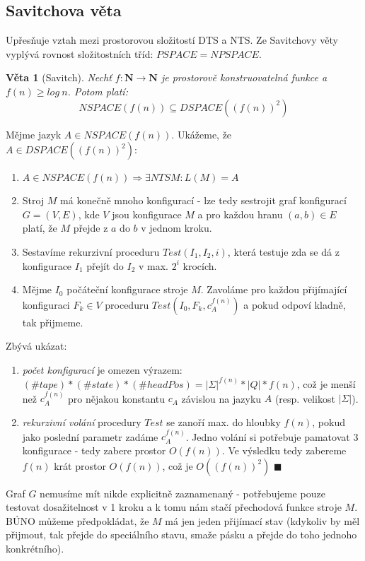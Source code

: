 \documentclass[a4paper]{article}      %
\newtheorem{theorem}{Věta}[section]
\newenvironment{proof}[1][Důkaz]{\begin{trivlist}
\item[\hskip \labelsep {\bfseries #1}]}{\end{trivlist}}
\newcommand{\qed}{$\blacksquare$}
\begin{document}
\subsection{Savitchova věta}
Upřesňuje vztah mezi prostorovou složitostí DTS a NTS. Ze Savitchovy věty vyplývá rovnost složitostních tříd: $PSPACE = NPSPACE$.

\begin{theorem}[Savitch]
Nechť $f: \mathbf{N} \rightarrow \mathbf{N}$ je prostorově konstruovatelná funkce a $f(n)\geq log\ n$.
Potom platí:
\[
NSPACE(f(n)) \subseteq DSPACE((f(n))^{2})
\]
\end{theorem}

\begin{proof}
Mějme jazyk $A\in NSPACE(f(n))$. Ukážeme, že $A \in DSPACE((f(n))^{2})$:
\begin{enumerate}
\item $A \in NSPACE(f(n)) \Rightarrow \exists NTS M: L(M)=A$
\item Stroj $M$ má konečně mnoho konfigurací - lze tedy sestrojit graf konfigurací $G=(V,E)$, kde $V$ jsou konfigurace $M$ a pro každou hranu $(a,b) \in E$ platí, že $M$ přejde z $a$ do $b$ v jednom kroku. 
\item Sestavíme rekurzivní proceduru $Test(I_1,I_2,i)$, která testuje zda se dá z konfigurace $I_1$ přejít do $I_2$ v max. $2^{i}$ krocích.
\item Mějme $I_0$ počáteční konfigurace stroje $M$. Zavoláme pro každou přijímající konfiguraci $F_k \in V$ proceduru $Test(I_0,F_k,c_{A}^{f(n)})$ a pokud odpoví kladně, tak přijmeme. 
\end{enumerate}
Zbývá ukázat:
\begin{enumerate}
\item \emph{počet konfigurací} je omezen výrazem: $(\#tape)*(\#state)*(\#headPos) = |\Sigma|^{f(n)}*|Q|*f(n)$,
což je menší než $c_{A}^{f(n)}$ pro nějakou konstantu $c_{A}$ závislou na jazyku $A$ (resp. velikost $|\Sigma|$).
\item \emph{rekurzivní volání} procedury $Test$ se zanoří max. do hloubky $f(n)$, pokud jako poslední parametr zadáme $c_{A}^{f(n)}$. Jedno volání si potřebuje pamatovat 3 konfigurace - tedy zabere prostor $O(f(n))$. Ve výsledku tedy zabereme $f(n)$ krát prostor $O(f(n))$, což je $O((f(n))^{2})$ \qed
\end{enumerate}
Graf $G$ nemusíme mít nikde explicitně zaznamenaný - potřebujeme pouze testovat dosažitelnost v 1 kroku a k tomu nám stačí přechodová funkce stroje $M$. BÚNO můžeme předpokládat, že $M$ má jen jeden přijímací stav (kdykoliv by měl přijmout, tak přejde do speciálního stavu, smaže pásku a přejde do toho jednoho konkrétního).
\end{proof}
\end{document}
